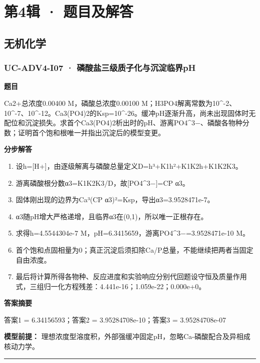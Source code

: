 \documentclass[UTF8,11pt,a4paper]{ctexart}
\begin{document}
\section*{第4辑 · 题目及解答}
\subsection*{无机化学}
\subsubsection*{UC-ADV4-I07 · 磷酸盐三级质子化与沉淀临界pH}
\noindent\textbf{题目}\par
Ca2+总浓度0.00400 M，磷酸总浓度0.00100 M；H3PO4解离常数为10\textasciicircum{}-2、10\textasciicircum{}-7、10\textasciicircum{}-12。Ca3(PO4)2的Ksp=10\textasciicircum{}-26。缓冲pH逐渐升高，尚未出现固体时无配位和沉淀损失。求首个Ca3(PO4)2析出时的pH、游离PO4\textasciicircum{}3−、磷酸各物种分数；证明首个饱和根唯一并指出沉淀后的模型变更。\par
\medskip\noindent\textbf{分步解答}
\begin{enumerate}
\item 设h=[H+]，由逐级解离与磷酸总量定义D=h³+K1h²+K1K2h+K1K2K3。
\item 游离磷酸根分数α3=K1K2K3/D，故[PO4\textasciicircum{}3−]=CP α3。
\item 固体刚出现的边界为Ca³(CP α3)²=Ksp，导出α3=3.9528471e-7。
\item α3随pH增大严格递增，且临界α3在(0,1)，所以唯一正根存在。
\item 求得h=4.5544304e-7 M，pH=6.3415659，游离PO4\textasciicircum{}3−=3.9528471e-10 M。
\item 首个饱和点固相量为0；真正沉淀后须扣除Ca/P总量，不能继续把两者当固定自由浓度。
\item 最后将计算所得各物种、反应进度和实验响应分别代回题设守恒及质量作用式，三组归一化方程残差：4.441e-16；1.059e-22；0.000e+0。
\end{enumerate}
\noindent\textbf{答案摘要}\par
答案1 = 6.34156593；答案2 = 3.95284708e-10；答案3 = 3.95284708e-07\par
\noindent\textbf{模型前提：}
理想浓度型溶度积，外部强缓冲固定pH，忽略Ca-磷酸配合及异相成核动力学。\par
\medskip\hrule\medskip
{}
\end{document}
